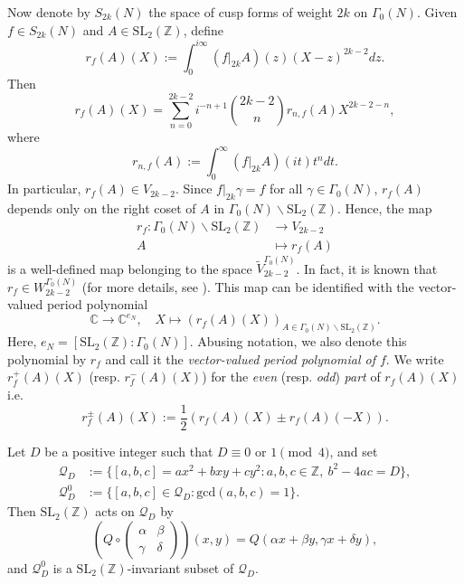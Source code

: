 \documentclass[12pt]{amsart}
\numberwithin{equation}{section}
\theoremstyle{definition}
\begin{document}
Now denote by $S_{2k}(N)$ the space of cusp forms of weight $2k$ on $\Gamma_{0}(N)$. 
Given $f\in S_{2k}(N)$ and $A\in\mathrm{SL}_{2}(\mathbb{Z})$, define
\begin{equation}\label{eq-vvpp}
    r_{f}(A)(X):=\int_{0}^{i\infty}(f|_{2k}A)(z)(X-z)^{2k-2}dz.
\end{equation}
Then
\begin{equation}\label{eq-vvppexp}
    r_{f}(A)(X)=\sum_{n=0}^{2k-2}i^{-n+1}\binom{2k-2}{n}r_{n,f}(A)X^{2k-2-n},
\end{equation}
where
$$r_{n,f}(A):=\int_{0}^{\infty}(f|_{2k}A)(it)t^{n}dt.$$
In particular, $r_{f}(A)\in V_{2k-2}$. 
Since $f|_{2k}\gamma=f$ for all $\gamma\in\Gamma_{0}(N)$, $r_{f}(A)$ depends only on the right coset of $A$ in $\Gamma_{0}(N)\backslash\mathrm{SL}_{2}(\mathbb{Z})$. Hence, the map
\begin{align*}
    r_{f}:\Gamma_{0}(N)\backslash\mathrm{SL}_{2}(\mathbb{Z})&\rightarrow V_{2k-2}\\
    A&\mapsto r_{f}(A)
\end{align*}
is a well-defined map belonging to the space $\widetilde{V}_{2k-2}^{\Gamma_{0}(N)}$. 
In fact, it is known that $r_{f}\in W_{2k-2}^{\Gamma_{0}(N)}$ (for more details, see \cite[p. 716]{PP13}). This map can be identified with the vector-valued period polynomial
$$\mathbb{C}\rightarrow\mathbb{C}^{e_{N}},\quad X\mapsto (r_{f}(A)(X))_{A\in\Gamma_{0}(N)\backslash\mathrm{SL}_{2}(\mathbb{Z})}.$$
Here, $e_{N}=[\mathrm{SL}_{2}(\mathbb{Z}):\Gamma_{0}(N)]$. Abusing notation, we also denote this polynomial by $r_{f}$ and call it the \textit{vector-valued period polynomial of $f$}. We write $r_{f}^{+}(A)(X)$ (resp. $r_{f}^{-}(A)(X)$) for the \textit{even} (resp. \textit{odd}) \textit{part} of $r_{f}(A)(X)$ i.e.
$$r_{f}^{\pm}(A)(X):=\frac{1}{2}(r_{f}(A)(X)\pm r_{f}(A)(-X)).$$

Let $D$ be a positive integer such that $D\equiv 0$ or $1\pmod{4}$, and set
\begin{align*}
    \mathcal{Q}_{D}&:=\{[a,b,c]=ax^{2}+bxy+cy^{2}:a,b,c\in\mathbb{Z},~b^{2}-4ac=D\},\\
    \mathcal{Q}_{D}^{0}&:=\{[a,b,c]\in\mathcal{Q}_{D}:\mathrm{gcd}(a,b,c)=1\}.
\end{align*}
Then $\mathrm{SL}_{2}(\mathbb{Z})$ acts on $\mathcal{Q}_{D}$ by
$$\left(Q\circ\left(\begin{smallmatrix}
    \alpha & \beta \\ \gamma & \delta
\end{smallmatrix}\right)\right)(x,y)=Q(\alpha x+\beta y,\gamma x+\delta y),$$
and $\mathcal{Q}_{D}^{0}$ is a $\mathrm{SL}_{2}(\mathbb{Z})$-invariant subset of $\mathcal{Q}_{D}$.
\end{document}
